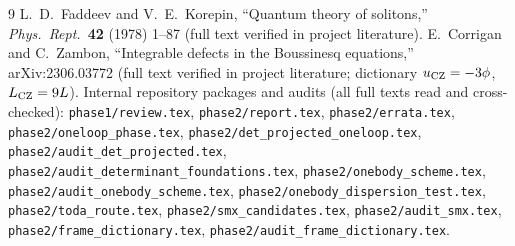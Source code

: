 \documentclass[11pt,a4paper]{article}
\begin{document}
\begin{thebibliography}{9}
L.~D.~Faddeev and V.~E.~Korepin, ``Quantum theory of solitons,'' \emph{Phys.\ Rept.}\ \textbf{42} (1978) 1--87 (full text verified in project literature).
E.~Corrigan and C.~Zambon, ``Integrable defects in the Boussinesq equations,'' arXiv:2306.03772 (full text verified in project literature; dictionary $u_{\rm CZ}=-3\phi$, $L_{\rm CZ}=9L$).
Internal repository packages and audits (all full texts read and cross-checked): \texttt{phase1/review.tex}, \texttt{phase2/report.tex}, \texttt{phase2/errata.tex}, \texttt{phase2/oneloop\_phase.tex}, \texttt{phase2/det\_projected\_oneloop.tex}, \texttt{phase2/audit\_det\_projected.tex}, \texttt{phase2/audit\_determinant\_foundations.tex}, \texttt{phase2/onebody\_scheme.tex}, \texttt{phase2/audit\_onebody\_scheme.tex}, \texttt{phase2/onebody\_dispersion\_test.tex}, \texttt{phase2/toda\_route.tex}, \texttt{phase2/smx\_candidates.tex}, \texttt{phase2/audit\_smx.tex}, \texttt{phase2/frame\_dictionary.tex}, \texttt{phase2/audit\_frame\_dictionary.tex}.
\end{thebibliography}
\end{document}
